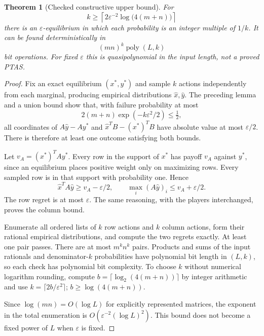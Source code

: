 \documentclass[11pt,a4paper]{article}
\newtheorem{theorem}{Theorem}[section]
\theoremstyle{definition}
\theoremstyle{remark}
\begin{document}
\begin{theorem}[Checked constructive upper bound]
For
\[
 k\geq\left\lceil 2\varepsilon^{-2}\log\bigl(4(m+n)\bigr)\right\rceil
\]
there is an $\varepsilon$-equilibrium in which each probability is an integer multiple of $1/k$. It can be found deterministically in
\[
 (mn)^k\operatorname{poly}(L,k)
\]
bit operations. For fixed $\varepsilon$ this is quasipolynomial in the input length, not a proved PTAS.
\end{theorem}
\begin{proof}
Fix an exact equilibrium $(x^*,y^*)$ and sample $k$ actions independently from each marginal, producing empirical distributions $\widehat x,\widehat y$. The preceding lemma and a union bound show that, with failure probability at most
\[
 2(m+n)\exp(-k\varepsilon^2/2)\leq\tfrac12,
\]
all coordinates of $A\widehat y-Ay^*$ and $\widehat x^TB-(x^*)^TB$ have absolute value at most $\varepsilon/2$. There is therefore at least one outcome satisfying both bounds.

Let $v_A=(x^*)^TAy^*$. Every row in the support of $x^*$ has payoff $v_A$ against $y^*$, since an equilibrium places positive weight only on maximizing rows. Every sampled row is in that support with probability one. Hence
\[
 \widehat x^TA\widehat y\geq v_A-\varepsilon/2,
 \qquad \max_i(A\widehat y)_i\leq v_A+\varepsilon/2.
\]
The row regret is at most $\varepsilon$. The same reasoning, with the players interchanged, proves the column bound.

Enumerate all ordered lists of $k$ row actions and $k$ column actions, form their rational empirical distributions, and compute the two regrets exactly. At least one pair passes. There are at most $m^kn^k$ pairs. Products and sums of the input rationals and denominator-$k$ probabilities have polynomial bit length in $(L,k)$, so each check has polynomial bit complexity. To choose $k$ without numerical logarithm rounding, compute $b=\lceil\log_2(4(m+n))\rceil$ by integer arithmetic and use $k=\lceil2b/\varepsilon^2\rceil$; $b\geq\log(4(m+n))$.

Since $\log(mn)=O(\log L)$ for explicitly represented matrices, the exponent in the total enumeration is $O(\varepsilon^{-2}(\log L)^2)$. This bound does not become a fixed power of $L$ when $\varepsilon$ is fixed.
\end{proof}
\end{document}
